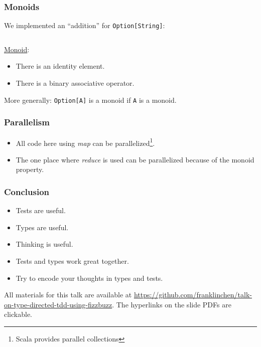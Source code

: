 \begin{frame}[fragile]
  \frametitle{Monoids}

  We implemented an ``addition'' for \texttt{Option[String]}:
  \inputminted{scala}{FizzBuzz8.scala}
  
  \href{http://en.wikipedia.org/wiki/Monoid}{Monoid}:
  \begin{itemize}
  \item There is an identity element.
  \item There is a binary associative operator.
  \end{itemize}

  More generally: \texttt{Option[A]} is a monoid if \texttt{A} is a monoid.
\end{frame}

\begin{frame}
  \frametitle{Parallelism}

  \begin{itemize}
  \item All code here using \emph{map} can be parallelized\footnote{Scala provides parallel collections}.
  \item The one place where \emph{reduce} is used can be parallelized because of the monoid property.
  \end{itemize}
\end{frame}

\begin{frame}
  \frametitle{Conclusion}

  \begin{itemize}
  \item Tests are useful.
  \item Types are useful.
  \item Thinking is useful.
  \end{itemize}

  \begin{itemize}
  \item Tests and types work great together.
  \item Try to encode your thoughts in types and tests.
  \end{itemize}

  All materials for this talk are available at \url{https://github.com/franklinchen/talk-on-type-directed-tdd-using-fizzbuzz}. The hyperlinks on the slide PDFs are clickable.
\end{frame}


